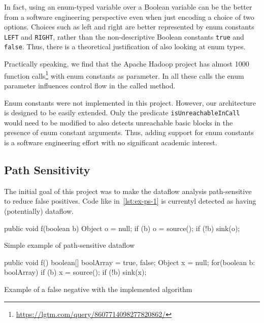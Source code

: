 In fact, using an enum-typed variable over a Boolean variable can be the better
 from a software engineering perspective
even when just encoding a choice of two options.
Choices such as left and right are better represented 
by enum constants \texttt{LEFT} and \texttt{RIGHT}, rather than the 
non-descriptive Boolean constants \texttt{true} and \texttt{false}.
Thus, there is a theoretical justification of also looking at enum types.

Practically speaking, we find that the Apache Hadoop project has almost 1000
function calls\footnote{\url{https://lgtm.com/query/8607714098277820862/}} with 
enum constants as parameter.
In all these calls the enum parameter influences control flow in the called method.

Enum constants were not implemented in this project.
However, our architecture is designed to be easily extended.
Only the predicate \texttt{isUnreachableInCall} would need to be modified 
to also detects unreachable basic blocks in the presence of enum constant arguments.
Thus, adding support for enum constants is a software engineering effort
with no significant academic interest.

\subsection{Path Sensitivity}
The initial goal of this project was to make the dataflow analysis path-sensitive
to reduce false positives. Code like in~\autoref{lst:ex-ps-1} is currentyl detected 
as having (potentially) dataflow.

\begin{listing}[h]
    \begin{javacode}
public void f(boolean b) {
    Object o = null;
    if (b) {
        o = source();
    }
    if (!b) {
        sink(o);
    }
}
    \end{javacode}
    \caption{Simple example of path-sensitive dataflow}
    \label{lst:ex-ps-1}
\end{listing}

\begin{listing}[h]
    \begin{javacode}
public void f() {
    boolean[] boolArray = {true, false};
    Object x = null;
    for(boolean b: boolArray) {
        if (b) {
            x = source();
        }
        if (!b) {
            sink(x);
        }
    }
}
    \end{javacode}
    \caption{Example of a false negative with the implemented algorithm}
    \label{lst:ps-false-negative}
\end{listing}

